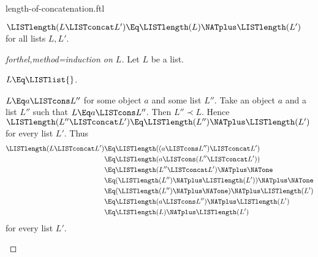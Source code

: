 \documentclass{stex}
\begin{document}
\begin{smodule}{length-of-concatenation.ftl}

\begin{proposition}[forthel]
  $\LISTlength(L \LISTconcat L') \Eq \LISTlength(L) \NATplus \LISTlength(L')$ for all lists $L, L'$.
\end{proposition}
\begin{proof}[forthel,method=induction on $L$]
  Let $L$ be a list.

  \begin{case}{$L \Eq \LISTlist{}$.}\end{case}

  \begin{case}{$L \Eq a \LISTcons L''$ for some object $a$ and some list $L''$.}
    Take an object $a$ and a list $L''$ such that $L \Eq a \LISTcons L''$.
    Then $L'' \prec L$.
    Hence $\LISTlength(L'' \LISTconcat L') \Eq \LISTlength(L'') \NATplus \LISTlength(L')$ for every list $L'$.
    Thus
    \begin{align*}
      \LISTlength(L \LISTconcat L')
        &\Eq \LISTlength((a \LISTcons L'') \LISTconcat L')\\
        &\Eq \LISTlength(a \LISTcons (L'' \LISTconcat L'))\\
        &\Eq \LISTlength(L'' \LISTconcat L') \NATplus \NATone\\
        &\Eq (\LISTlength(L'') \NATplus \LISTlength(L')) \NATplus \NATone\\
        &\Eq (\LISTlength(L'') \NATplus \NATone) \NATplus \LISTlength(L')\\
        &\Eq \LISTlength(a \LISTcons L'') \NATplus \LISTlength(L')\\
        &\Eq \LISTlength(L) \NATplus \LISTlength(L')
    \end{align*}
    for every list $L'$.
  \end{case}
\end{proof}
\end{smodule}
\end{document}
